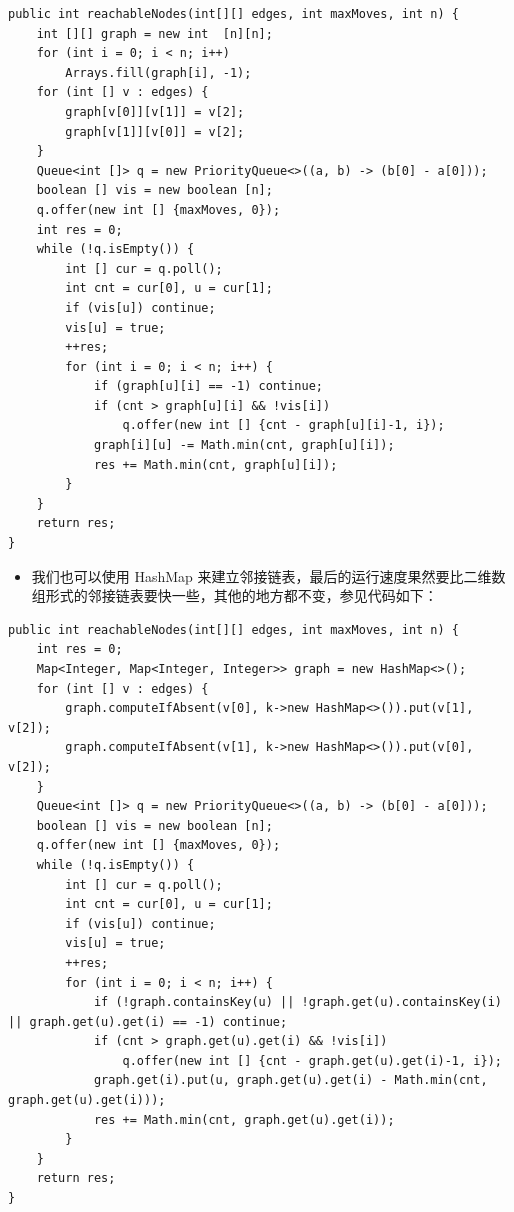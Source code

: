 \documentclass[9pt, b5paaper]{book}
\begin{document}
\begin{verbatim}
public int reachableNodes(int[][] edges, int maxMoves, int n) {
    int [][] graph = new int  [n][n];
    for (int i = 0; i < n; i++) 
        Arrays.fill(graph[i], -1);
    for (int [] v : edges) {
        graph[v[0]][v[1]] = v[2];
        graph[v[1]][v[0]] = v[2];
    }
    Queue<int []> q = new PriorityQueue<>((a, b) -> (b[0] - a[0]));
    boolean [] vis = new boolean [n];
    q.offer(new int [] {maxMoves, 0});
    int res = 0;
    while (!q.isEmpty()) {
        int [] cur = q.poll();
        int cnt = cur[0], u = cur[1];
        if (vis[u]) continue;
        vis[u] = true;
        ++res;
        for (int i = 0; i < n; i++) {
            if (graph[u][i] == -1) continue;
            if (cnt > graph[u][i] && !vis[i])
                q.offer(new int [] {cnt - graph[u][i]-1, i});
            graph[i][u] -= Math.min(cnt, graph[u][i]);
            res += Math.min(cnt, graph[u][i]);
        }
    }
    return res;
}
\end{verbatim}
\begin{itemize}
\item 我们也可以使用 HashMap 来建立邻接链表，最后的运行速度果然要比二维数组形式的邻接链表要快一些，其他的地方都不变，参见代码如下：
\end{itemize}
\begin{verbatim}
public int reachableNodes(int[][] edges, int maxMoves, int n) {
    int res = 0;
    Map<Integer, Map<Integer, Integer>> graph = new HashMap<>();
    for (int [] v : edges) {
        graph.computeIfAbsent(v[0], k->new HashMap<>()).put(v[1], v[2]);
        graph.computeIfAbsent(v[1], k->new HashMap<>()).put(v[0], v[2]);
    }
    Queue<int []> q = new PriorityQueue<>((a, b) -> (b[0] - a[0]));
    boolean [] vis = new boolean [n];
    q.offer(new int [] {maxMoves, 0});
    while (!q.isEmpty()) {
        int [] cur = q.poll();
        int cnt = cur[0], u = cur[1];
        if (vis[u]) continue;
        vis[u] = true;
        ++res;
        for (int i = 0; i < n; i++) {
            if (!graph.containsKey(u) || !graph.get(u).containsKey(i) || graph.get(u).get(i) == -1) continue;
            if (cnt > graph.get(u).get(i) && !vis[i])
                q.offer(new int [] {cnt - graph.get(u).get(i)-1, i});
            graph.get(i).put(u, graph.get(u).get(i) - Math.min(cnt, graph.get(u).get(i)));
            res += Math.min(cnt, graph.get(u).get(i));
        }
    }
    return res;
}
\end{verbatim}
\end{document}
